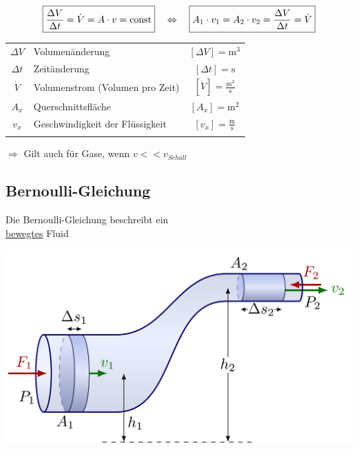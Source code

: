 $$ \boxed{ \frac{\Delta V}{\Delta t} = \dot{V} = A \cdot v = \mathrm{const} } \quad \Leftrightarrow \quad \boxed{  A_1 \cdot v_1 = A_2 \cdot v_2 = \frac{\Delta V}{\Delta t} = \dot{V}} $$ 

\begin{tabular}{c l c}
		$\Delta V$ & Volumenänderung & $[\Delta V] = \mathrm{m^3}$ \\
		$\Delta t$ & Zeitänderung & $[\Delta t] = \mathrm{s}$  \\
		\rule{0pt}{8pt}$\dot{V}$ & Volumenstrom (Volumen pro Zeit) & $[\dot{V}] = \mathrm{\frac{m^3}{s}}$ \\
		$A_x$ & Querschnittsfläche & $[A_x] = \mathrm{m^2}$ \\
		\rule{0pt}{8pt}$v_x$ & Geschwindigkeit der Flüssigkeit & $[v_x] = \mathrm{\frac{m}{s}}$ \\
		\\
	\end{tabular}

$\Rightarrow$ Gilt auch für Gase, wenn $v << v_{Schall}$



\subsection{Bernoulli-Gleichung}

\begin{minipage}{0.38\linewidth}
Die Bernoulli-Gleichung beschreibt ein \\
\underline{bewegtes} Fluid \\
\end{minipage}
\hfill
\begin{minipage}{0.6\linewidth}
\includegraphics[width=0.99\linewidth]{Bilder/Bernoulli} \\
\end{minipage}








